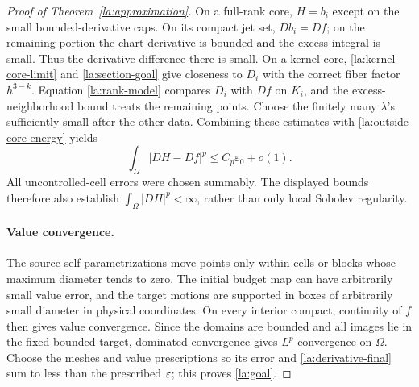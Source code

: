 \begin{proof}[Proof of Theorem~\ref{la:approximation}]
On a full-rank core, $H=b_i$ except on the small bounded-derivative
caps.  On its compact jet set, $Db_i=Df$; on the remaining portion the
chart derivative is bounded and the excess integral is small.
Thus the derivative difference there is small.  On a kernel core,
\eqref{la:kernel-core-limit} and \eqref{la:section-goal} give closeness
to $D_i$ with the correct fiber factor $h^{3-k}$.  Equation
\eqref{la:rank-model} compares $D_i$ with $Df$ on $K_i$, and the
excess-neighborhood bound treats the remaining points.  Choose the
finitely many $\lambda$'s sufficiently small after the other data.
Combining these estimates with \eqref{la:outside-core-energy} yields
\begin{equation}\label{la:derivative-final}
 \int_\Omega|DH-Df|^p\le C_p\varepsilon_0+o(1).
\end{equation}
All uncontrolled-cell errors were chosen summably.  The displayed
bounds therefore also establish $\int_\Omega|DH|^p<\infty$, rather
than only local Sobolev regularity.

\paragraph{Value convergence.}
The source self-parametrizations move points only within cells or
blocks whose maximum diameter tends to zero.  The initial budget map
can have arbitrarily small value error, and the target motions are
supported in boxes of arbitrarily small diameter in physical
coordinates.  On every interior compact, continuity of $f$ then
gives value convergence.  Since the domains are bounded and all
images lie in the fixed bounded target, dominated convergence gives
$L^p$ convergence on $\Omega$.  Choose the meshes and value
prescriptions so its error and \eqref{la:derivative-final} sum to less
than the prescribed $\varepsilon$; this proves \eqref{la:goal}.

\end{proof}
